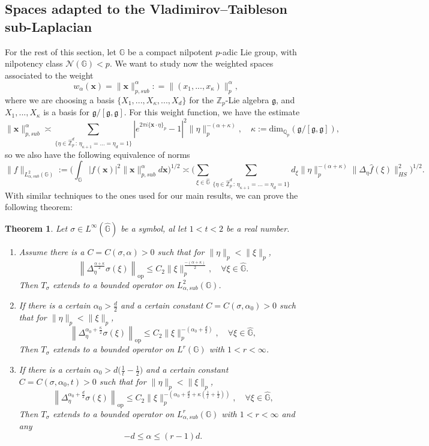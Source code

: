 \documentclass[12pt, reqno]{amsart}
\newtheorem{teo}[defi]{Theorem}
\newcommand{\Q}{\mathbb{Q}}
\newcommand{\Z}{\mathbb{Z}}
\newcommand{\1}{\mathds{1}}
\newcommand{\G}{\mathbb{G}}
\newcommand{\g}{\mathfrak{g}}
\begin{document}
\subsection{Spaces adapted to the Vladimirov--Taibleson sub-Laplacian} For the rest of this section, let $\G$ be a compact nilpotent $p$-adic Lie group, with nilpotency class $\mathscr{N}(\G) <p $. We want to study now the weighted spaces associated to the weight $$w_\alpha (\mathbf{x}) = \| \mathbf{x} \|_{p, sub}^\alpha : = \|(x_1,...,x_\kappa) \|_p^\alpha,$$where we are choosing a basis $\{X_1,...,X_\kappa,...,X_d \}$ for the $\Z_p$-Lie algebra $\g$, and $X_1,...,X_\kappa$ is a basis for $\g/[\g,\g]$. For this weight function, we have the estimate $$\| \mathbf{x} \|_{p,sub}^\alpha \asymp \sum_{\{ \eta \in \widehat{\Z}_p^d \, : \, \eta_{\kappa+1} = ...= \eta_d = 1 \}} |e^{2 \pi i \{ \mathbf{x} \cdot \eta \}_p}-1|^2 \| \eta \|_p^{-(\alpha + \kappa)},\quad \kappa:= \mathrm{dim}_{\Q_p} (\g/[\g , \g]),$$
so we also have the following equivalence of norms $$\| f \|_{L^2_{\alpha, sub}(\G)}:= \Big(\int_{\G} |f(\mathbf{x})|^2 \| \mathbf{x} \|^\alpha_{p,sub} d \mathbf{x}\Big)^{1/2} \asymp \Big( \sum_{\xi \in \widehat{\G}} \sum_{\{ \eta \in \widehat{\Z}_p^d \, : \, \eta_{\kappa+1} = ...= \eta_d = 1 \}} d_\xi \| \eta \|_p^{-(\alpha + \kappa)}\| \Delta_\eta \widehat{f}(\xi) \|_{HS}^2 \Big)^{1/2}.$$
With similar techniques to the ones used for our main results, we can prove the following theorem: 

\begin{teo}\label{teosublaplacianspaces}
Let $\sigma \in L^\infty (\widehat{\G})$ be a symbol, al let $1 <t <2$ be a real number.
\begin{enumerate}
    \item Assume there is a $C = C(\sigma,\alpha) > 0$ such that for $\|\eta\|_p < \|\xi\|_p$,
    \[
    \left\| \Delta_{\eta}^{\frac{\alpha + \kappa}{2}} \sigma(\xi) \right\|_{\mathrm{op}} \leq C_2 \|\xi\|_p^\frac{-(\alpha + \kappa)}{2}, \quad \forall \xi \in \widehat{\mathbb{G}}.
    \] Then $T_\sigma$ extends to a bounded operator on $L^2_{\alpha, sub}(\mathbb{G})$.
    \item If there is a certain $\alpha_0> \frac{d}{2}$ and a certain constant  $C = C(\sigma,\alpha_0) > 0$ such that for $\|\eta\|_p < \|\xi\|_p$,
    \[
    \left\| \Delta_{\eta}^{\alpha_0 +\frac{ \kappa}{2}} \sigma(\xi) \right\|_{\mathrm{op}} \leq C_2 \|\xi\|_p^{-(\alpha_0+\frac{ d}{2})}, \quad \forall \xi \in \widehat{\mathbb{G}},
    \]Then $T_\sigma$ extends to a bounded operator on $L^r(\G)$ with $1 <r<\infty$.
    \item If there is a certain $\alpha_0> d \big( \frac{1}{t} - \frac{1}{2} \big)$ and a certain constant  $C = C(\sigma,\alpha_0,t) > 0$ such that for $\|\eta\|_p < \|\xi\|_p$,
    \[
    \left\| \Delta_{\eta}^{\alpha_0 +\frac{ d}{2}} \sigma(\xi) \right\|_{\mathrm{op}} \leq C_2 \|\xi\|_p^{-(\alpha_0+\frac{d}{2} + \kappa (
    \frac{1}{t}+\frac{1}{2}))}, \quad \forall \xi \in \widehat{\mathbb{G}},
    \]Then $T_\sigma$ extends to a bounded operator on $L^r_{\alpha, sub} (\G)$ with $1 <r<\infty$ and any $$ -d \leq \alpha \leq (r-1) d.$$
\end{enumerate}
\end{teo}
\end{document}
